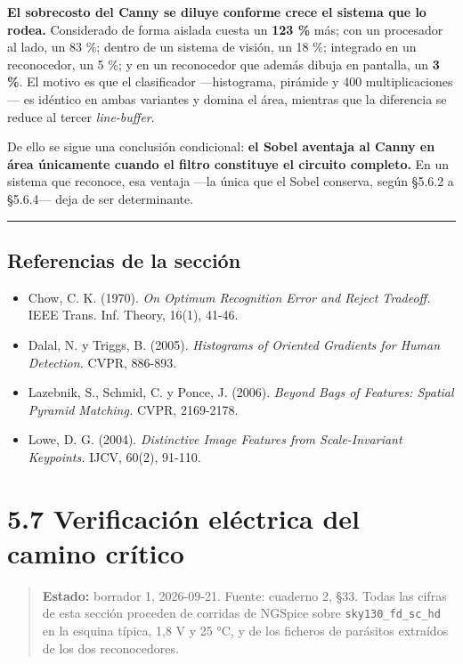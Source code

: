 \textbf{El sobrecosto del Canny se diluye conforme crece el sistema que
lo rodea.} Considerado de forma aislada cuesta un \textbf{123 \%} más;
con un procesador al lado, un 83 \%; dentro de un sistema de visión, un
18 \%; integrado en un reconocedor, un 5 \%; y en un reconocedor que
además dibuja en pantalla, un \textbf{3 \%}. El motivo es que el
clasificador ---histograma, pirámide y 400 multiplicaciones--- es
idéntico en ambas variantes y domina el área, mientras que la diferencia
se reduce al tercer \emph{line-buffer}.

De ello se sigue una conclusión condicional: \textbf{el Sobel aventaja
al Canny en área únicamente cuando el filtro constituye el circuito
completo.} En un sistema que reconoce, esa ventaja ---la única que el
Sobel conserva, según §5.6.2 a §5.6.4--- deja de ser determinante.

\begin{center}\rule{0.5\linewidth}{0.5pt}\end{center}

\subsection{Referencias de la
sección}\label{referencias-de-la-secciuxf3n}

\begin{itemize}
\tightlist
\item
  Chow, C. K. (1970). \emph{On Optimum Recognition Error and Reject
  Tradeoff.} IEEE Trans. Inf. Theory, 16(1), 41-46.
\item
  Dalal, N. y Triggs, B. (2005). \emph{Histograms of Oriented Gradients
  for Human Detection.} CVPR, 886-893.
\item
  Lazebnik, S., Schmid, C. y Ponce, J. (2006). \emph{Beyond Bags of
  Features: Spatial Pyramid Matching.} CVPR, 2169-2178.
\item
  Lowe, D. G. (2004). \emph{Distinctive Image Features from
  Scale-Invariant Keypoints.} IJCV, 60(2), 91-110.
\end{itemize}

\section{5.7 Verificación eléctrica del camino
crítico}\label{verificaciuxf3n-eluxe9ctrica-del-camino-cruxedtico}

\begin{quote}
\textbf{Estado:} borrador 1, 2026-09-21. Fuente: cuaderno 2, §33. Todas
las cifras de esta sección proceden de corridas de NGSpice sobre
\texttt{sky130\_fd\_sc\_hd} en la esquina típica, 1,8 V y 25 °C, y de
los ficheros de parásitos extraídos de los dos reconocedores.
\end{quote}

